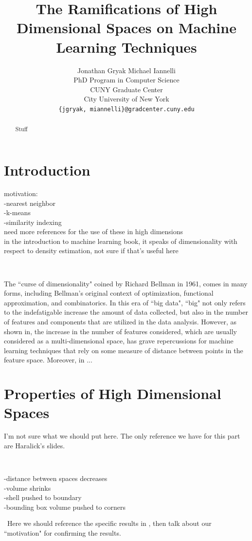 \documentclass{article}
\title{The Ramifications of High Dimensional Spaces on Machine Learning Techniques}
\author{Jonathan Gryak
\qquad
Michael Iannelli\\
PhD Program in Computer Science\\
CUNY Graduate Center\\
City University of New York\\
\texttt{\{jgryak, miannelli\}@gradcenter.cuny.edu}}
\date{}
\begin{document}
\maketitle

\begin{abstract}
Stuff
\end{abstract}
\tableofcontents
\section{Introduction}
motivation:\\
-nearest neighbor\\
-k-means\\
-similarity indexing\\
need more references for the use of these in high dimensions\\
in the introduction to machine learning book, it speaks of dimensionality with respect to density estimation,
not sure if that's useful here

\

The ``curse of dimensionality" coined by Richard Bellman in 1961\cite{bellman1961adaptive}, comes in many forms, including Bellman's original context of optimization, functional approximation, and combinatorics. In this era of ``big data", ``big" not only refers to the indefatigable increase the amount of data collected, but also in the number of features and components that are utilized in the data analysis. However,  as shown in\cite{aggarwal2001surprising}, the increase in the number of features considered, which are usually considered as a multi-dimensional space, has grave repercussions for machine learning techniques that rely on some measure of distance between points in the feature space. Moreover, in \cite{beyer1999nearest}...
\section{Properties of High Dimensional Spaces}
I'm not sure what we should put here. The only reference we have for this part are Haralick's slides.

\

-distance between spaces decreases\\
-volume shrinks\\
-shell pushed to boundary\\
-bounding box volume pushed to corners

\
Here we should reference the specific results in \cite{aggarwal2001surprising}, then talk about our ``motivation" for confirming the results.
\end{document}

